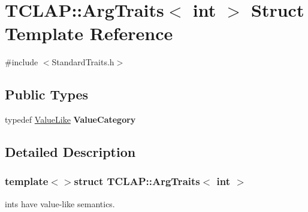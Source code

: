 \hypertarget{struct_t_c_l_a_p_1_1_arg_traits_3_01int_01_4}{\section{T\+C\+L\+A\+P\+:\+:Arg\+Traits$<$ int $>$ Struct Template Reference}
\label{struct_t_c_l_a_p_1_1_arg_traits_3_01int_01_4}
}


{\ttfamily \#include $<$Standard\+Traits.\+h$>$}

\subsection*{Public Types}
\begin{DoxyCompactItemize}
\item 
\hypertarget{struct_t_c_l_a_p_1_1_arg_traits_3_01int_01_4_a8e577764b626e9e928d71567123d92a9}{typedef \hyperlink{struct_t_c_l_a_p_1_1_value_like}{Value\+Like} {\bfseries Value\+Category}}\label{struct_t_c_l_a_p_1_1_arg_traits_3_01int_01_4_a8e577764b626e9e928d71567123d92a9}

\end{DoxyCompactItemize}


\subsection{Detailed Description}
\subsubsection*{template$<$$>$struct T\+C\+L\+A\+P\+::\+Arg\+Traits$<$ int $>$}

ints have value-\/like semantics. 
